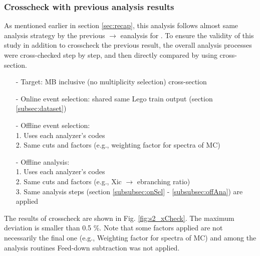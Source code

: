 \subsubsection{Crosscheck with previous analysis results} \label{subsubsec:xCheck}
%
As mentioned earlier in section \ref{sec:recap}, this analysis follows almost same analysis strategy by the previous \Xic $\rightarrow$ e\Xim analysis for  \TeV. To ensure the validity of this study in addition to crosscheck the previous result, the overall analysis processes were cross-checked step by step, and then directly compared by using \Xic cross-section.
%
\begin{itemize}
    \small
    \item []  \vspace{1pt}
    \item[-] Target: MB inclusive (no multiplicity selection) \Xic cross-section
    \item[-] Online event selection: shared same Lego train output (section \ref{subsec:dataset}) \vspace{1pt}
    \item[-] Offline event selection: \\
     1. Uses each analyzer's codes \\
     2. Same cuts and factors (e.g., weighting factor for \pt spectra of MC) \vspace{1pt}
    \item[-] Offline analysis: \\
     1. Uses each analyzer's codes \\
     2. Same cuts and factors (e.g., Xic $\rightarrow$ e\Xim branching ratio) \\
     3. Same analysis steps (section \ref{subsubsec:onSel} - \ref{subsubsec:offAna}) are applied
\end{itemize}
%
The results of crosscheck are shown in Fig. \ref{fig:s2_xCheck}. The maximum deviation is smaller than 0.5 \%. Note that some factors applied are not necessarily the final one (e.g., Weighting factor for \pt spectra of MC) and among the analysis routines Feed-down subtraction was not applied.

